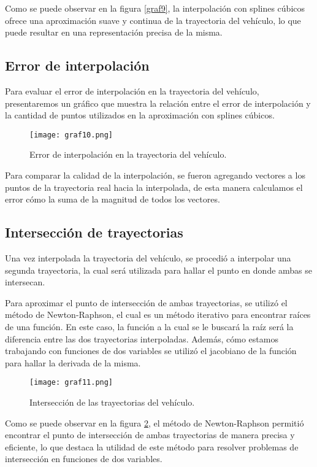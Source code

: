 \documentclass[12pt,a4]{article} %
\begin{document}
\begin{multicols}{2}
Como se puede observar en la figura \ref{graf9}, la interpolación con splines cúbicos ofrece una aproximación suave y continua de la trayectoria del vehículo, lo que puede resultar en una representación precisa de la misma.

\subsection{Error de interpolación}

Para evaluar el error de interpolación en la trayectoria del vehículo, presentaremos un gráfico que muestra la relación entre el error de interpolación y la cantidad de puntos utilizados en la aproximación con splines cúbicos.

\begin{figure}[H] 
    \centering
    \texttt{[image: graf10.png]}
    \caption{Error de interpolación en la trayectoria del vehículo.}
    \label{graf10}
\end{figure}

Para comparar la calidad de la interpolación, se fueron agregando vectores a los puntos de la trayectoria real hacia la interpolada, de esta manera calculamos el error cómo la suma de la magnitud de todos los vectores.

\subsection{Intersección de trayectorias}

Una vez interpolada la trayectoria del vehículo, se procedió a interpolar una segunda trayectoria, la cual será utilizada para hallar el punto en donde ambas se intersecan.

Para aproximar el punto de intersección de ambas trayectorias, se utilizó el método de Newton-Raphson, el cual es un método iterativo para encontrar raíces de una función. En este caso, la función a la cual se le buscará la raíz será la diferencia entre las dos trayectorias interpoladas.
Además, cómo estamos trabajando con funciones de dos variables se utilizó el jacobiano de la función para hallar la derivada de la misma.

\begin{figure}[H] 
    \centering
    \texttt{[image: graf11.png]}
    \caption{Intersección de las trayectorias del vehículo.}
    \label{graf11}
\end{figure}

Como se puede observar en la figura \ref{graf11}, el método de Newton-Raphson permitió encontrar el punto de intersección de ambas trayectorias de manera precisa y eficiente, lo que destaca la utilidad de este método para resolver problemas de intersección en funciones de dos variables.


\end{multicols}
\end{document}
